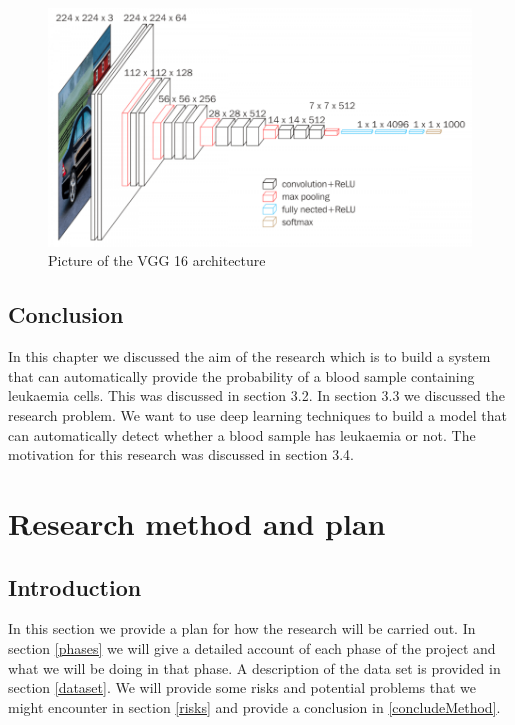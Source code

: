 \documentclass[a4paper,11pt]{article}
\begin{document}
\begin{figure}[!htbp]
\includegraphics[scale=0.4]{vgg16.png} 
\caption{Picture of the VGG 16 architecture \citep{AlexNet}}
\label{fig: vgg16}
\end{figure}

\subsection{Conclusion}
\label{concludeObjective}
In this chapter we discussed the aim of the research which is to build a system that can automatically provide the probability of a blood sample containing leukaemia cells. This was discussed in section 3.2. In section 3.3 we discussed the research problem. We want to use deep learning techniques to build a model that can automatically detect whether a blood sample has leukaemia or not. The motivation for this research was discussed in section 3.4.  

\section{Research method and plan}
\subsection{Introduction}
In this section we provide a plan for how the research will be carried out. In section \ref{phases} we will give a detailed account of each phase of the project and what we will be doing in that phase. A description of the data set is provided in section \ref{dataset}. We will provide some risks and potential problems that we might encounter in section \ref{risks} and provide a conclusion in \ref{concludeMethod}. 
\end{document}
